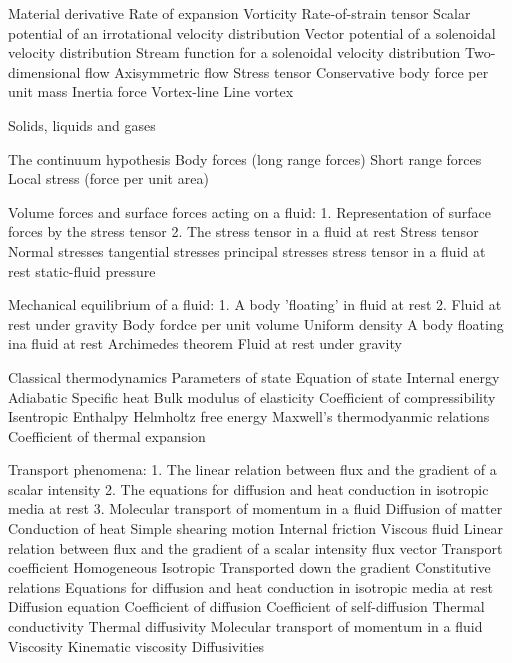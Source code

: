 

\usepackage[english]{babel}



\begin{multicols}{3}
  Material derivative
  Rate of expansion
  Vorticity
  Rate-of-strain tensor
  Scalar potential of an irrotational velocity distribution
  Vector potential of a solenoidal velocity distribution
  Stream function for a solenoidal velocity distribution
  Two-dimensional flow
  Axisymmetric flow
  Stress tensor
  Conservative body force per unit mass
  Inertia force
  Vortex-line
  Line vortex


  Solids, liquids and gases


  The continuum hypothesis
  Body forces (long range forces)
  Short range forces
  Local stress (force per unit area)


  Volume forces and surface forces acting on a fluid:
  1. Representation of surface forces by the stress tensor
  2. The stress tensor in a fluid at rest
  Stress tensor
  Normal stresses
  tangential stresses
  principal stresses
  stress tensor in a fluid at rest
  static-fluid pressure


  Mechanical equilibrium of a fluid:
  1. A body 'floating' in fluid at rest
  2. Fluid at rest under gravity
  Body fordce per unit volume
  Uniform density
  A body floating ina fluid at rest
  Archimedes theorem
  Fluid at rest under gravity

  Classical thermodynamics
  Parameters of state
  Equation of state
  Internal energy
  Adiabatic
  Specific heat
  Bulk modulus of elasticity
  Coefficient of compressibility
  Isentropic
  Enthalpy
  Helmholtz free energy
  Maxwell's thermodyanmic relations
  Coefficient of thermal expansion


  Transport phenomena:
  1. The linear relation between flux and the gradient of a scalar intensity
  2. The equations for diffusion and heat conduction in isotropic media at rest
  3. Molecular transport of momentum in a fluid
  Diffusion of matter
  Conduction of heat
  Simple shearing motion
  Internal friction
  Viscous fluid
  Linear relation between flux and the gradient of a scalar intensity
  flux vector
  Transport coefficient
  Homogeneous
  Isotropic
  Transported down the gradient
  Constitutive relations
  Equations for diffusion and heat conduction in isotropic media at rest
  Diffusion equation
  Coefficient of diffusion
  Coefficient of self-diffusion
  Thermal conductivity
  Thermal diffusivity
  Molecular transport of momentum in a fluid
  Viscosity
  Kinematic viscosity
  Diffusivities



\end{multicols}
